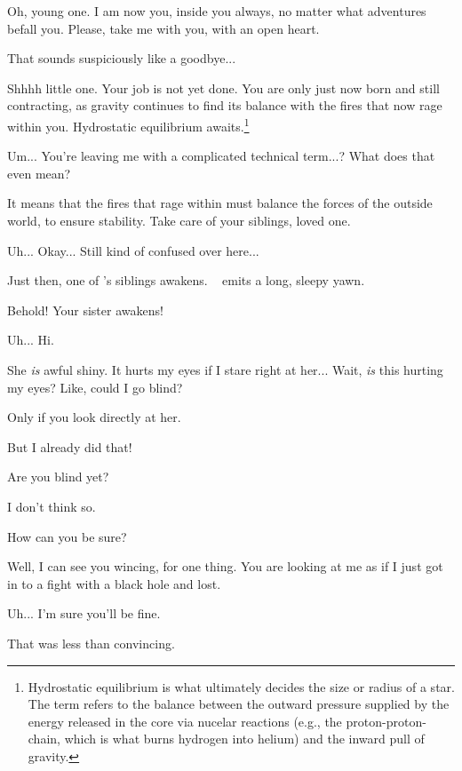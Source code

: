 \documentclass[main.tex]{subfiles}
\begin{document}

\newpara \Pleione Oh, young one.  I am now you, inside you always, no matter what adventures befall you.  Please, take me with you, with an open heart.

\newpara \Maia That sounds suspiciously like a goodbye...

\newpara \Pleione Shhhh little one.  Your job is not yet done.  You are only just now born and still contracting, as gravity continues to find its balance with the fires that now rage within you.  Hydrostatic equilibrium awaits.\footnote{Hydrostatic equilibrium is what ultimately decides the size or radius of a star.  The term refers to the balance between the outward pressure supplied by the energy released in the core via nucelar reactions (e.g., the proton-proton-chain, which is what burns hydrogen into helium) and the inward pull of gravity.}

\newpara \Maia Um... You're leaving me with a complicated technical term...?  What does that even mean?

\newpara \Pleione It means that the fires that rage within must balance the forces of the outside world, to ensure stability.  Take care of your siblings, loved one.

\newpara \Maia Uh... Okay...  Still kind of confused over here...

\newpara \nar Just then, one of \rmmaia's siblings awakens.  \rmelectra~ emits a long, sleepy yawn.

\newpara \Pleione Behold!  Your sister awakens!

\newpara \Electra  Uh... Hi.

\newpara \Maia She \textit{is} awful shiny.  It hurts my eyes if I stare right at her... Wait, \textit{is} this hurting my eyes?  Like, could I go blind?

\newpara \Pleione Only if you look directly at her.

\newpara \Maia But I already did that!

\newpara \Pleione Are you blind yet?

\newpara \Maia I don't think so.  

\newpara \Pleione How can you be sure?

\newpara \Maia Well, I can see you wincing, for one thing.  You are looking at me as if I just got in to a fight with a black hole and lost.

\newpara \Pleione Uh... I'm sure you'll be fine. 

\newpara \Maia That was less than convincing.
\end{document}
